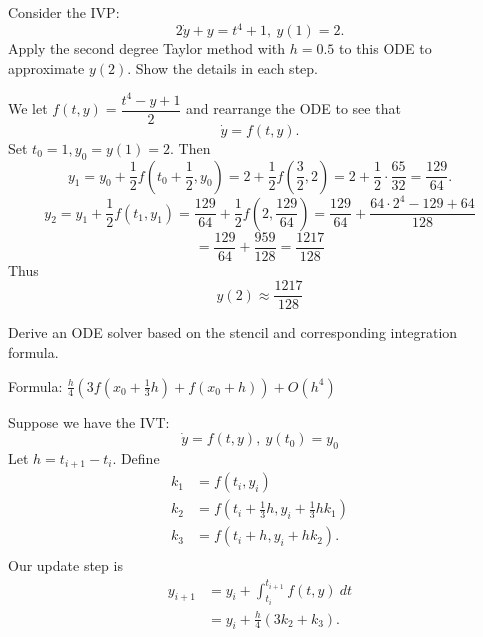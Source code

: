 \documentclass{eh-homework}
\begin{document}
    \begin{question}{4}
        Consider the IVP:
        \[
            2\dot y + y = t^4 + 1,\ y(1) = 2.
        \]
        Apply the second degree Taylor method with \(h = 0.5\) to this ODE to approximate \(y(2)\). Show the details in each step.

        \medskip

        We let \(f(t,y) = \dfrac{t^4 - y + 1}{2}\) and rearrange the ODE to see that
        \[
            \dot y = f(t,y).
        \]
        Set \(t_0 = 1, y_0 = y(1) = 2\). Then
        \[
            y_1 = y_0 + \frac{1}{2} f\left(t_0 + \frac{1}{2}, y_0\right) = 2 + \frac{1}{2} f\left(\frac{3}{2}, 2\right) = 2 + \frac{1}{2}\cdot\frac{65}{32} = \frac{129}{64}.
        \]
        \[
            y_2 = y_1 + \frac{1}{2}f(t_1, y_1) = \frac{129}{64} + \frac{1}{2}f\left(2, \frac{129}{64}\right) = \frac{129}{64} + \frac{64 \cdot 2^4 - 129 + 64}{128}
        \]
        \[
            = \frac{129}{64} + \frac{959}{128} = \frac{1217}{128}
        \]
        Thus
        \[
            y(2) \approx \frac{1217}{128}
        \]
    \end{question}
    \begin{question}{5}
        Derive an ODE solver based on the stencil and corresponding integration formula.

        Formula: \(\frac{h}{4}\left( 3f \left( x_0 + \frac{1}{3}h \right) + f(x_0 + h) \right) + O (h^4)\)

        \medskip

        Suppose we have the IVT:
        \[
            \dot y = f(t,y),\ y(t_0) = y_0
        \]
        Let \(h = t_{i+1} - t_i\). Define
        \begin{align*}
            k_1 &= f(t_i, y_i) \\
            k_2 &= f \left( t_i + \frac{1}{3}h, y_i + \frac{1}{3}hk_1 \right) \\
            k_3 &= f (t_i + h, y_i + hk_2). \\
        \end{align*}
        Our update step is
        \begin{align*}
            y_{i+1} &= y_i + \int _{t_i}^{t_{i+1}}f(t,y)\ dt \\
            &= y_i + \frac{h}{4}(3k_2 + k_3).
        \end{align*}
    \end{question}
\end{document}
